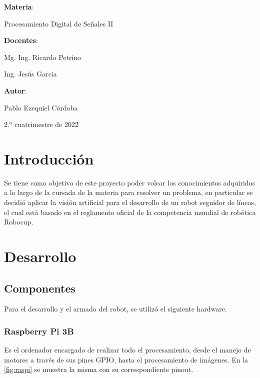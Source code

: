 \documentclass[11pt,a4paper]{article}
\begin{document}
{\begin{titlepage}
			{\Large \textbf{Materia}: \par Procesamiento Digital de Señales II\par}
			
			\vspace{1cm}
			
			{\Large \textbf{Docentes}:  \par Mg. Ing. Ricardo Petrino \par Ing. Jesús Garcia}
			
			\vspace{1cm}
			
			{\Large \textbf{Autor}:\par Pablo Ezequiel Córdoba}
			
			\vfill
			
			{\Large $\mathrm{2.^{o}}$ cuatrimestre de 2022\par}
	\end{titlepage}}
	
	\tableofcontents
	\newpage
	
	\section{Introducción}
	Se tiene como objetivo de este proyecto poder volcar los conocimientos adquiridos a lo largo de la cursada de la materia para resolver un problema, en particular se decidió aplicar la visión artificial para el desarrollo de un robot seguidor de líneas, el cual está basado en el reglamento oficial de la competencia mundial de robótica Robocup. \cite{reglamento_robocup}
	
	\section{Desarrollo}
	\subsection{Componentes}
	Para el desarrollo y el armado del robot, se utilizó el siguiente hardware.
	
	\subsubsection{Raspberry Pi 3B}
	Es el ordenador encargado de realizar todo el procesamiento, desde el manejo de motores a través de sus pines GPIO, hasta el procesamiento de imágenes. En la \autoref*{fig:raspi} se muestra la misma con su correspondiente pinout. \cite{raspi}
	
\end{document}
